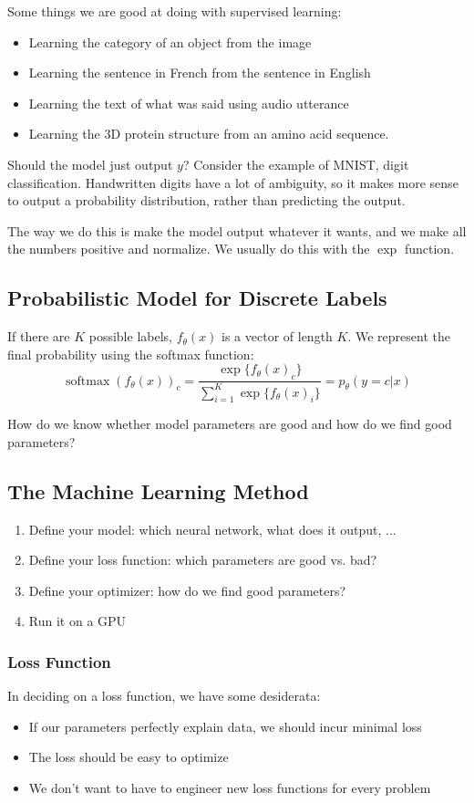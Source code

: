\documentclass[11pt]{scrartcl}
\newcommand{\1}{\textbf{1}} %
\begin{document}
Some things we are good at doing with supervised learning:
\begin{itemize}
\item Learning the category of an object from the image
\item Learning the sentence in French from the sentence in English
\item Learning the text of what was said using audio utterance
\item Learning the 3D protein structure from an amino acid sequence.
\end{itemize}

Should the model just output $y$?  Consider the example of MNIST, digit classification.  Handwritten digits have a lot of ambiguity, so it makes more sense to output a probability distribution, rather than predicting the output.

The way we do this is make the model output whatever it wants, and we make all the numbers positive and normalize.  We usually do this with the $\exp$ function.

\subsection{Probabilistic Model for Discrete Labels}
If there are $K$ possible labels, $f_\theta(x)$ is a vector of length $K$.  We represent the final probability using the softmax function: 
$$\operatorname{softmax}{(f_\theta(x))_c} = \frac{    \exp\{f_\theta(x)_c\} }{\sum_{i=1}^K \exp\{f_\theta(x)_i\}} = p_\theta(y = c | x)$$

How do we know whether model parameters are good and how do we find good parameters?

\subsection{The Machine Learning Method}
\begin{enumerate}
\item Define your model: which neural network, what does it output, ...
\item Define your loss function: which parameters are good vs. bad?
\item Define your optimizer: how do we find good parameters?
\item Run it on a GPU
\end{enumerate}

\subsubsection{Loss Function}
In deciding on a loss function, we have some desiderata: 
\begin{itemize}
\item If our parameters perfectly explain data, we should incur minimal loss
\item The loss should be easy to optimize
\item We don't want to have to engineer new loss functions for every problem
\end{itemize}
\end{document}
